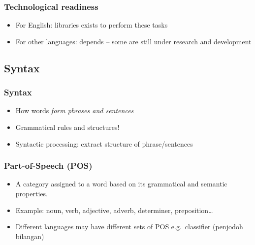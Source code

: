 \begin{frame}
\frametitle{Technological readiness}
    
\begin{itemize}
\item For English: libraries exists to perform these tasks
\item For other languages: depends -- some are still under research and development
\end{itemize}

\end{frame}

\subsection{Syntax}

\begin{frame}
\frametitle{Syntax}
\begin{itemize}
\item How words \emph{form phrases and sentences}
\item Grammatical rules and structures!
\item Syntactic processing: extract structure of phrase/sentences
\end{itemize}
\end{frame}


\begin{frame}[allowframebreaks]
\frametitle{Part-of-Speech (POS)}

\begin{itemize}[<+->]
\item A category assigned to a word based on its grammatical and semantic properties.
\item Example: noun, verb, adjective, adverb, determiner, preposition\ldots
\item Different languages may have different sets of POS e.g.~classifier (penjodoh bilangan)
\end{itemize}
\end{frame}

